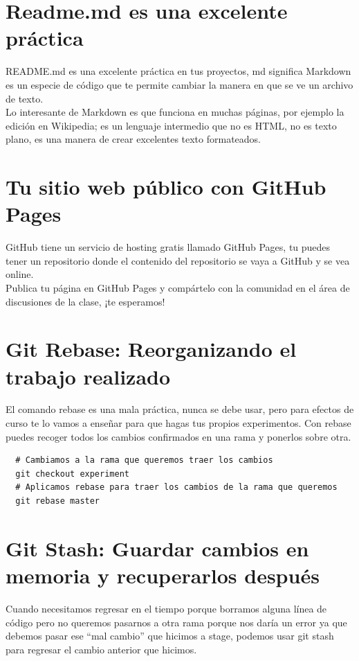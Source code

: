 \documentclass{article}
\begin{document}
\section{Readme.md es una excelente práctica}%
README.md es una excelente práctica en tus proyectos, md significa Markdown es
un especie de código que te permite cambiar la manera en que se ve un archivo
de texto.\\

Lo interesante de Markdown es que funciona en muchas páginas, por ejemplo la
edición en Wikipedia; es un lenguaje intermedio que no es HTML, no es texto
plano, es una manera de crear excelentes texto formateados.


\section{Tu sitio web público con GitHub Pages}%
GitHub tiene un servicio de hosting gratis llamado GitHub Pages, tu puedes
tener un repositorio donde el contenido del repositorio se vaya a GitHub y se
vea online.\\

Publica tu página en GitHub Pages y compártelo con la comunidad en el área de
discusiones de la clase, ¡te esperamos!


\section{Git Rebase: Reorganizando el trabajo realizado}%
El comando rebase es una mala práctica, nunca se debe usar, pero para efectos
de curso te lo vamos a enseñar para que hagas tus propios experimentos. Con
rebase puedes recoger todos los cambios confirmados en una rama y ponerlos
sobre otra.

\begin{verbatim}
  # Cambiamos a la rama que queremos traer los cambios
  git checkout experiment
  # Aplicamos rebase para traer los cambios de la rama que queremos 
  git rebase master
\end{verbatim}

\section{Git Stash: Guardar cambios en memoria y recuperarlos después}%
Cuando necesitamos regresar en el tiempo porque borramos alguna línea de código
pero no queremos pasarnos a otra rama porque nos daría un error ya que debemos
pasar ese “mal cambio” que hicimos a stage, podemos usar git stash para
regresar el cambio anterior que hicimos.\\
\end{document}
